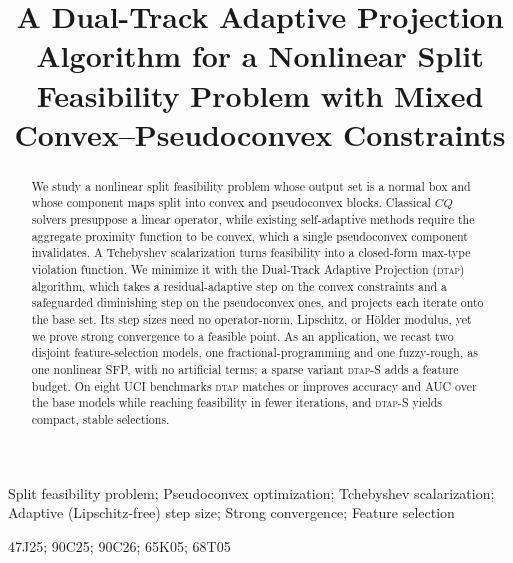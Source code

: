 \documentclass[]{interact}
\theoremstyle{plain}
\theoremstyle{definition}
\theoremstyle{remark}
\newcommand{\dtap}{\textsc{dtap}}
\begin{document}
\title{A Dual-Track Adaptive Projection Algorithm for a Nonlinear Split Feasibility Problem with Mixed Convex--Pseudoconvex Constraints}

\author{
}

\maketitle

\begin{abstract}
We study a nonlinear split feasibility problem whose output set is a normal box and whose component maps split into convex and pseudoconvex blocks. Classical $CQ$ solvers presuppose a linear operator, while existing self-adaptive methods require the aggregate proximity function to be convex, which a single pseudoconvex component invalidates. A Tchebyshev scalarization turns feasibility into a closed-form max-type violation function. We minimize it with the Dual-Track Adaptive Projection (\dtap) algorithm, which takes a residual-adaptive step on the convex constraints and a safeguarded diminishing step on the pseudoconvex ones, and projects each iterate onto the base set. Its step sizes need no operator-norm, Lipschitz, or Hölder modulus, yet we prove strong convergence to a feasible point. As an application, we recast two disjoint feature-selection models, one fractional-programming and one fuzzy-rough, as one nonlinear SFP, with no artificial terms; a sparse variant \dtap-S adds a feature budget. On eight UCI benchmarks \dtap{} matches or improves accuracy and AUC over the base models while reaching feasibility in fewer iterations, and \dtap-S yields compact, stable selections.
\end{abstract}

\begin{keywords}
Split feasibility problem; Pseudoconvex optimization; Tchebyshev scalarization; Adaptive (Lipschitz-free) step size; Strong convergence; Feature selection
\end{keywords}

\begin{amscode}
47J25; 90C25; 90C26; 65K05; 68T05
\end{amscode}
\end{document}
